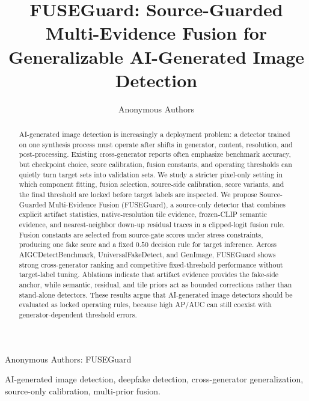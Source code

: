 \documentclass[lettersize,journal]{IEEEtran}
\begin{document}
\title{FUSEGuard: Source-Guarded Multi-Evidence Fusion for Generalizable AI-Generated Image Detection}

\author{Anonymous Authors}

%
{Anonymous Authors: FUSEGuard}

\maketitle

\begin{abstract}
AI-generated image detection is increasingly a deployment problem: a detector trained on one synthesis process must operate after shifts in generator, content, resolution, and post-processing. Existing cross-generator reports often emphasize benchmark accuracy, but checkpoint choice, score calibration, fusion constants, and operating thresholds can quietly turn target sets into validation sets. We study a stricter pixel-only setting in which component fitting, fusion selection, source-side calibration, score variants, and the final threshold are locked before target labels are inspected. We propose Source-Guarded Multi-Evidence Fusion (FUSEGuard), a source-only detector that combines explicit artifact statistics, native-resolution tile evidence, frozen-CLIP semantic evidence, and nearest-neighbor down-up residual traces in a clipped-logit fusion rule. Fusion constants are selected from source-gate scores under stress constraints, producing one fake score and a fixed $0.50$ decision rule for target inference. Across AIGCDetectBenchmark, UniversalFakeDetect, and GenImage, FUSEGuard shows strong cross-generator ranking and competitive fixed-threshold performance without target-label tuning. Ablations indicate that artifact evidence provides the fake-side anchor, while semantic, residual, and tile priors act as bounded corrections rather than stand-alone detectors. These results argue that AI-generated image detectors should be evaluated as locked operating rules, because high AP/AUC can still coexist with generator-dependent threshold errors.
\end{abstract}

\begin{IEEEkeywords}
AI-generated image detection, deepfake detection, cross-generator generalization, source-only calibration, multi-prior fusion.
\end{IEEEkeywords}
\end{document}
